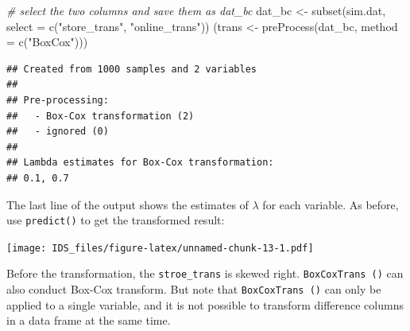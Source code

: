 \documentclass[
  12pt,
]{krantz}
\makeatletter
\newenvironment{Shaded}{\begin{snugshade}}{\end{snugshade}}
\newcommand{\AttributeTok}[1]{\textcolor[rgb]{0.61,0.61,0.61}{#1}}
\newcommand{\CommentTok}[1]{\textcolor[rgb]{0.37,0.37,0.37}{\textit{#1}}}
\newcommand{\DecValTok}[1]{\textcolor[rgb]{0.06,0.06,0.06}{#1}}
\newcommand{\FunctionTok}[1]{\textcolor[rgb]{0,0,0}{#1}}
\newcommand{\NormalTok}[1]{#1}
\newcommand{\OtherTok}[1]{\textcolor[rgb]{0.37,0.37,0.37}{#1}}
\newcommand{\SpecialCharTok}[1]{\textcolor[rgb]{0,0,0}{#1}}
\newcommand{\StringTok}[1]{\textcolor[rgb]{0.5,0.5,0.5}{#1}}
\newenvironment{kframe}{%
\medskip{}
\setlength{\fboxsep}{.8em}
 \def\at@end@of@kframe{}%
 \ifinner\ifhmode%
  \def\at@end@of@kframe{\end{minipage}}%
  \begin{minipage}{\columnwidth}%
 \fi\fi%
 \def\FrameCommand##1{\hskip\@totalleftmargin \hskip-\fboxsep
 \colorbox{shadecolor}{##1}\hskip-\fboxsep
     \hskip-\linewidth \hskip-\@totalleftmargin \hskip\columnwidth}%
 \MakeFramed {\advance\hsize-\width
   \@totalleftmargin\z@ \linewidth\hsize
   \@setminipage}}%
 {\par\unskip\endMakeFramed%
 \at@end@of@kframe}
\renewenvironment{Shaded}{\begin{kframe}}{\end{kframe}}
\makeatother
\begin{document}
\begin{Shaded}
\begin{Highlighting}[]
\CommentTok{\# select the two columns and save them as dat\_bc}
\NormalTok{dat\_bc }\OtherTok{\textless{}{-}} \FunctionTok{subset}\NormalTok{(sim.dat, }\AttributeTok{select =} \FunctionTok{c}\NormalTok{(}\StringTok{"store\_trans"}\NormalTok{, }\StringTok{"online\_trans"}\NormalTok{))}
\NormalTok{(trans }\OtherTok{\textless{}{-}} \FunctionTok{preProcess}\NormalTok{(dat\_bc, }\AttributeTok{method =} \FunctionTok{c}\NormalTok{(}\StringTok{"BoxCox"}\NormalTok{)))}
\end{Highlighting}
\end{Shaded}

\begin{verbatim}
## Created from 1000 samples and 2 variables
## 
## Pre-processing:
##   - Box-Cox transformation (2)
##   - ignored (0)
## 
## Lambda estimates for Box-Cox transformation:
## 0.1, 0.7
\end{verbatim}

The last line of the output shows the estimates of \(\lambda\) for each variable. As before, use \texttt{predict()} to get the transformed result:

\begin{Shaded}
\end{Shaded}

\texttt{[image: IDS\_files/figure-latex/unnamed-chunk-13-1.pdf]}

Before the transformation, the \texttt{stroe\_trans} is skewed right. \texttt{BoxCoxTrans\ ()} can also conduct Box-Cox transform. But note that \texttt{BoxCoxTrans\ ()} can only be applied to a single variable, and it is not possible to transform difference columns in a data frame at the same time.
\end{document}

